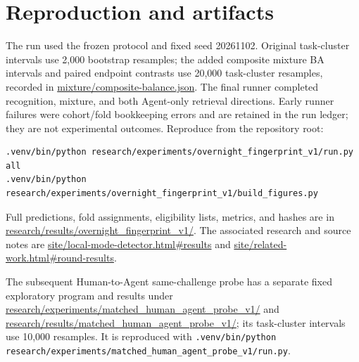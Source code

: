 \documentclass[11pt]{article}
\begin{document}
\section{Reproduction and artifacts}
The run used the frozen protocol and fixed seed 20261102. Original task-cluster intervals use 2,000 bootstrap resamples; the added composite mixture BA intervals and paired endpoint contrasts use 20,000 task-cluster resamples, recorded in \url{mixture/composite-balance.json}. The final runner completed recognition, mixture, and both Agent-only retrieval directions. Early runner failures were cohort/fold bookkeeping errors and are retained in the run ledger; they are not experimental outcomes. Reproduce from the repository root:
\begin{verbatim}
.venv/bin/python research/experiments/overnight_fingerprint_v1/run.py all
.venv/bin/python research/experiments/overnight_fingerprint_v1/build_figures.py
\end{verbatim}
Full predictions, fold assignments, eligibility lists, metrics, and hashes are in \url{research/results/overnight_fingerprint_v1/}. The associated research and source notes are \url{site/local-mode-detector.html#results} and \url{site/related-work.html#round-results}.

The subsequent Human-to-Agent same-challenge probe has a separate fixed exploratory program and results under \url{research/experiments/matched_human_agent_probe_v1/} and \url{research/results/matched_human_agent_probe_v1/}; its task-cluster intervals use 10,000 resamples. It is reproduced with \texttt{.venv/bin/python research/experiments/matched\_human\_agent\_probe\_v1/run.py}.
\end{document}
